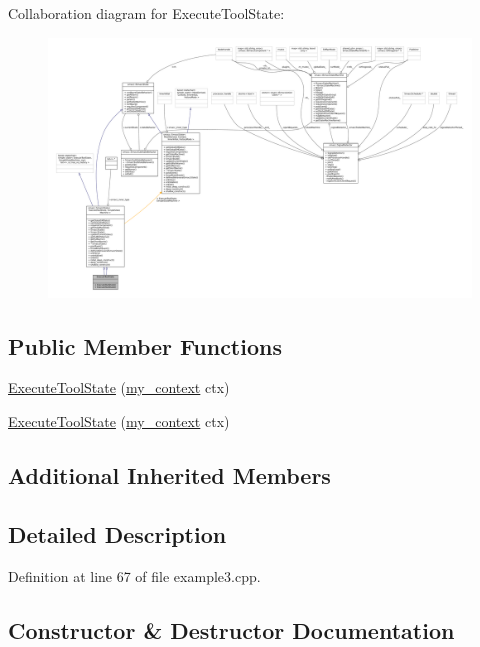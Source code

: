 Collaboration diagram for Execute\+Tool\+State\+:
\nopagebreak
\begin{figure}[H]
\begin{center}
\leavevmode
\includegraphics[width=350pt]{structExecuteToolState__coll__graph}
\end{center}
\end{figure}
\subsection*{Public Member Functions}
\begin{DoxyCompactItemize}
\item 
\hyperlink{structExecuteToolState_a3052bea444b30ad6669eb61c905d4ee1}{Execute\+Tool\+State} (\hyperlink{common_8h_af2dcacead80d69b96952496fe413bbfe}{my\+\_\+context} ctx)
\item 
\hyperlink{structExecuteToolState_a3052bea444b30ad6669eb61c905d4ee1}{Execute\+Tool\+State} (\hyperlink{common_8h_af2dcacead80d69b96952496fe413bbfe}{my\+\_\+context} ctx)
\end{DoxyCompactItemize}
\subsection*{Additional Inherited Members}


\subsection{Detailed Description}


Definition at line 67 of file example3.\+cpp.



\subsection{Constructor \& Destructor Documentation}
